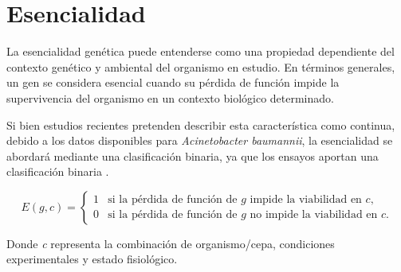 \chapter{Esencialidad}

La esencialidad genética puede entenderse como una propiedad dependiente del contexto genético y ambiental del organismo en estudio. En términos generales, un gen se considera esencial cuando su pérdida de función impide la supervivencia del organismo en un contexto biológico determinado. 

Si bien estudios recientes pretenden describir esta característica como continua, debido a los datos disponibles para \textit{Acinetobacter baumannii}, la esencialidad se abordará mediante una clasificación binaria, ya que los ensayos aportan una clasificación binaria \cite{EsencialidadRancati2018}.


\[
E(g,c) =
\begin{cases}
1 & \text{si la pérdida de función de } g \text{ impide la viabilidad en } c, \\
0 & \text{si la pérdida de función de } g \text{ no impide la viabilidad en } c.
\end{cases}
\]

Donde \textit{c} representa la combinación de organismo/cepa, condiciones experimentales y estado fisiológico.

\section{}
